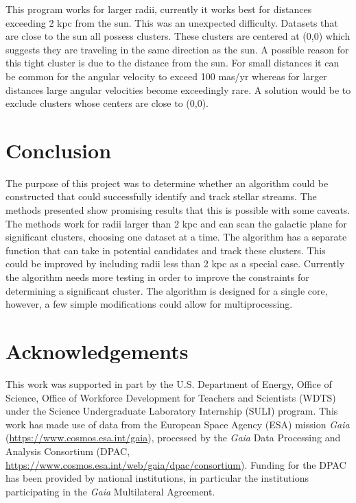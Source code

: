 \documentclass[notitlepage,nofootinbib,preprintnumbers,aps,prd]{revtex4-1}
\begin{document}
\indent This program works for larger radii, currently it works best for distances exceeding 2 kpc from the sun. This was an unexpected difficulty. Datasets that are close to the sun all possess clusters. These clusters are centered at (0,0) which suggests they are traveling in the same direction as the sun. A possible reason for this tight cluster is due to the distance from the sun. For small distances it can be common for the angular velocity to exceed 100 mas/yr whereas for larger distances large angular velocities become exceedingly rare. A solution would be to exclude clusters whose centers are close to (0,0).

\section{Conclusion}
\indent The purpose of this project was to determine whether an algorithm could be constructed that could successfully identify and track stellar streams. The methods presented show promising results that this is possible with some caveats. The methods work for radii larger than 2 kpc and can scan the galactic plane for significant clusters, choosing one dataset at a time. The algorithm has a separate function that can take in potential candidates and track these clusters. This could be improved by including radii less than 2 kpc as a special case. Currently the algorithm needs more testing in order to improve the constraints for determining a significant cluster. The algorithm is designed for a single core, however, a few simple modifications could allow for multiprocessing.\\
\section{Acknowledgements}
This work was supported in part by the U.S. Department of Energy, Office of Science, Office of Workforce Development for Teachers and Scientists (WDTS) under the Science Undergraduate Laboratory Internship (SULI) program. 
This work has made use of data from the European Space Agency (ESA) mission
{\it Gaia} (\url{https://www.cosmos.esa.int/gaia}), processed by the {\it Gaia}
Data Processing and Analysis Consortium (DPAC,
\url{https://www.cosmos.esa.int/web/gaia/dpac/consortium}). Funding for the DPAC
has been provided by national institutions, in particular the institutions
participating in the {\it Gaia} Multilateral Agreement.
	
\end{document}
